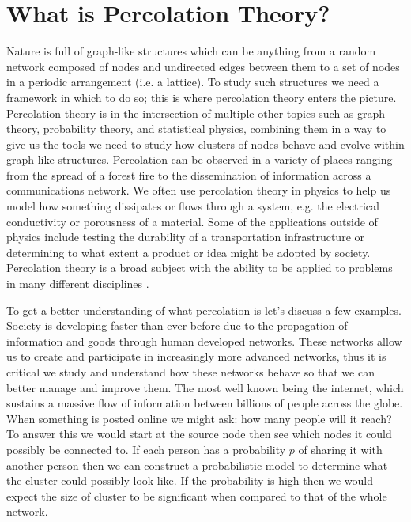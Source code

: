 \section{What is Percolation Theory?}
Nature is full of graph-like structures which can be anything from a random network composed of nodes and undirected edges between them to a set of nodes in a periodic arrangement (i.e. a lattice).
To study such structures we need a framework in which to do so; this is where percolation theory enters the picture.
Percolation theory is in the intersection of multiple other topics such as graph theory, probability theory, and statistical physics, combining them in a way to give us the tools we need to study how clusters of nodes behave and evolve within graph-like structures.
Percolation can be observed in a variety of places ranging from the spread of a forest fire to the dissemination of information across a communications network.
We often use percolation theory in physics to help us model how something dissipates or flows through a system, e.g. the electrical conductivity or porousness of a material.
Some of the applications outside of physics include testing the durability of a transportation infrastructure or determining to what extent a product or idea might be adopted by society.
Percolation theory is a broad subject with the ability to be applied to problems in many different disciplines \cite{intro_to_percolation_theory} \cite{applications_of_percolation_theory}.

To get a better understanding of what percolation is let's discuss a few examples.
Society is developing faster than ever before due to the propagation of information and goods through human developed networks.
These networks allow us to create and participate in increasingly more advanced networks, thus it is critical we study and understand how these networks behave so that we can better manage and improve them.
The most well known being the internet, which sustains a massive flow of information between billions of people across the globe.
When something is posted online we might ask: how many people will it reach?
To answer this we would start at the source node then see which nodes it could possibly be connected to.
If each person has a probability $p$ of sharing it with another person then we can construct a probabilistic model to determine what the cluster could possibly look like.
If the probability is high then we would expect the size of cluster to be significant when compared to that of the whole network.

